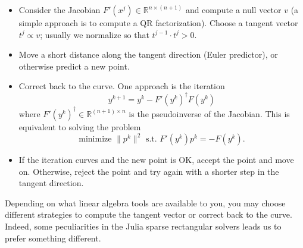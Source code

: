 \documentclass[12pt, leqno]{article} %
\providecommand{\tightlist}{%
  \setlength{\itemsep}{0pt}\setlength{\parskip}{0pt}}
\begin{document}
\begin{itemize}
\tightlist
\item
  Consider the Jacobian \(F'(x^j) \in {\mathbb{R}}^{n \times (n+1)}\)
  and compute a null vector \(v\) (a simple approach is to compute a QR
  factorization). Choose a tangent vector \(t^j \propto v\); usually we
  normalize so that \(t^{j-1} \cdot t^j > 0\).
\item
  Move a short distance along the tangent direction (Euler predictor),
  or otherwise predict a new point.
\item
  Correct back to the curve. One approach is the iteration
  \[y^{k+1} = y^k - F'(y^k)^\dagger F(y^k)\] where
  \(F'(y^k)^\dagger \in {\mathbb{R}}^{(n+1) \times n}\) is the
  pseudoinverse of the Jacobian. This is equivalent to solving the
  problem
  \[\mbox{minimize } \|p^k\|^2 \mbox{ s.t. } F'(y^k) p^k = -F(y^k).\]
\item
  If the iteration curves and the new point is OK, accept the point and
  move on. Otherwise, reject the point and try again with a shorter step
  in the tangent direction.
\end{itemize}

Depending on what linear algebra tools are available to you, you may
choose different strategies to compute the tangent vector or correct
back to the curve. Indeed, some peculiarities in the Julia sparse
rectangular solvers leads us to prefer something different.
\end{document}
